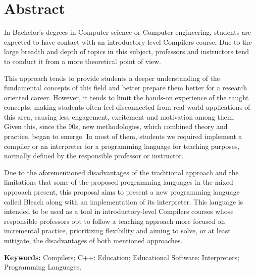 \chapter*{Abstract}
\begin{spacing}{1.0}
In Bachelor's degrees in Computer science or Computer engineering, students are expected to have contact with an introductory-level Compilers course. Due to the large breadth and depth of topics in this subject, professors and instructors tend to conduct it from a more theoretical point of view. 

This approach tends to provide students a deeper understanding of the fundamental concepts of this field and better prepare them better for a research oriented career. However, it tends to limit the hands-on experience of the taught concepts, making students often feel disconnected from real-world applications of this area, causing less engagement, excitement and motivation among them. Given this, since the 90s, new methodologies, which combined theory and practice, began to emerge. In most of them, students we required implement a compiler or an interpreter for a programming language for teaching purposes, normally defined by the responsible professor or instructor.

Due to the aforementioned disadvantages of the traditional approach and the limitations that some of the proposed programming languages in the mixed approach present, this proposal aims to present a new programming language called Bleach along with an implementation of its interpreter. This language is intended to be used as a tool in introductory-level Compilers courses whose responsible professors opt to follow a teaching approach more focused on incremental practice, prioritizing flexibility and aiming to solve, or at least mitigate, the disadvantages of both mentioned approaches.



\textbf{Keywords:} Compilers; C++; Education; Educational Software; Interpreters; Programming Languages.  

\end{spacing}